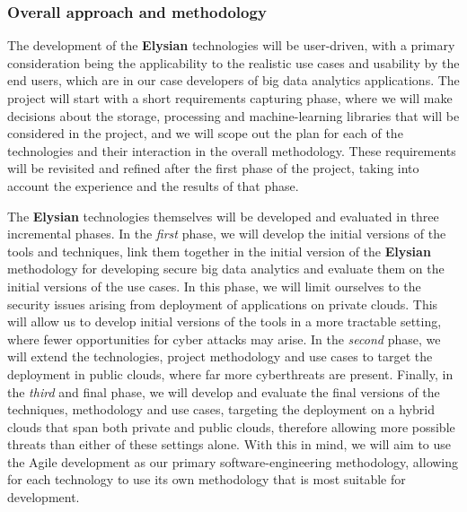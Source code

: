 \documentclass[a4paper,11pt]{article}
\newcommand{\project}[1]{\textbf{#1}\xspace}
\newcommand{\SECURITY}{\project{Elysian}}
\newcommand{\TheProject}{\SECURITY}
\begin{document}
\subsubsection{Overall approach and methodology}


The development of the \TheProject{} technologies will be user-driven, with a primary consideration being the applicability to the realistic use cases and usability by the end users, which are in our case developers of big data analytics applications. The project will start with a short requirements capturing phase, where we will make decisions about the storage, processing and machine-learning libraries that will be considered in the project, and we will scope out the plan for each of the technologies and their interaction in the overall methodology. These requirements will be revisited and refined after the first phase of the project, taking into account the experience and the results of that phase.

The \TheProject{} technologies themselves will be developed and evaluated in three incremental phases. In the \emph{first} phase, we will develop the initial versions of the tools and techniques, link them together in the initial version of the \TheProject{} methodology for developing secure big data analytics and evaluate them on the initial versions of the use cases. In this phase, we will limit ourselves to the security issues arising from deployment of applications on private clouds. This will allow us to develop initial versions of the tools in a more tractable setting, where fewer opportunities for cyber attacks may arise. In the \emph{second} phase, we will extend the technologies, project methodology and use cases to target the deployment in public clouds, where far more cyberthreats are present. Finally, in the \emph{third} and final phase, we will develop and evaluate the final versions of the techniques, methodology and use cases, targeting the deployment on a hybrid clouds that span both private and public clouds, therefore allowing more possible threats than either of these settings alone. With this in mind, we will aim to use the Agile development as our primary software-engineering methodology, allowing for each technology to use its own methodology that is most suitable for development.
\end{document}
